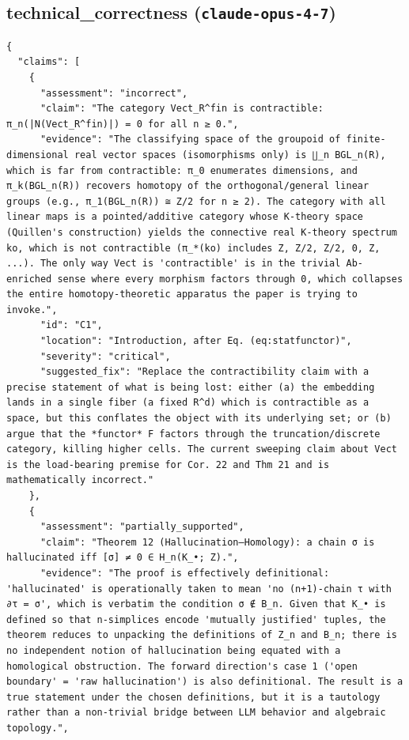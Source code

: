 \documentclass[11pt]{article}
\begin{document}
\subsection*{technical_correctness (\texttt{claude-opus-4-7})}
\begin{verbatim}
{
  "claims": [
    {
      "assessment": "incorrect",
      "claim": "The category Vect_R^fin is contractible: π_n(|N(Vect_R^fin)|) = 0 for all n ≥ 0.",
      "evidence": "The classifying space of the groupoid of finite-dimensional real vector spaces (isomorphisms only) is ∐_n BGL_n(R), which is far from contractible: π_0 enumerates dimensions, and π_k(BGL_n(R)) recovers homotopy of the orthogonal/general linear groups (e.g., π_1(BGL_n(R)) ≅ Z/2 for n ≥ 2). The category with all linear maps is a pointed/additive category whose K-theory space (Quillen's construction) yields the connective real K-theory spectrum ko, which is not contractible (π_*(ko) includes Z, Z/2, Z/2, 0, Z, ...). The only way Vect is 'contractible' is in the trivial Ab-enriched sense where every morphism factors through 0, which collapses the entire homotopy-theoretic apparatus the paper is trying to invoke.",
      "id": "C1",
      "location": "Introduction, after Eq. (eq:statfunctor)",
      "severity": "critical",
      "suggested_fix": "Replace the contractibility claim with a precise statement of what is being lost: either (a) the embedding lands in a single fiber (a fixed R^d) which is contractible as a space, but this conflates the object with its underlying set; or (b) argue that the *functor* F factors through the truncation/discrete category, killing higher cells. The current sweeping claim about Vect is the load-bearing premise for Cor. 22 and Thm 21 and is mathematically incorrect."
    },
    {
      "assessment": "partially_supported",
      "claim": "Theorem 12 (Hallucination–Homology): a chain σ is hallucinated iff [σ] ≠ 0 ∈ H_n(K_•; Z).",
      "evidence": "The proof is effectively definitional: 'hallucinated' is operationally taken to mean 'no (n+1)-chain τ with ∂τ = σ', which is verbatim the condition σ ∉ B_n. Given that K_• is defined so that n-simplices encode 'mutually justified' tuples, the theorem reduces to unpacking the definitions of Z_n and B_n; there is no independent notion of hallucination being equated with a homological obstruction. The forward direction's case 1 ('open boundary' = 'raw hallucination') is also definitional. The result is a true statement under the chosen definitions, but it is a tautology rather than a non-trivial bridge between LLM behavior and algebraic topology.",

\end{verbatim}
\end{document}
